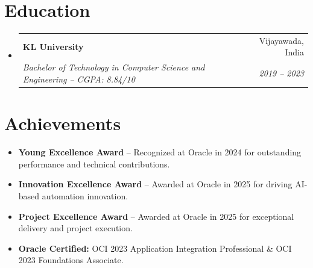\documentclass[letterpaper,11pt]{article}
\makeatletter
\newcommand{\resumeItem}[1]{
  \item\small{
    {#1 \vspace{-2pt}}
  }
}
\newcommand{\resumeSubheading}[4]{
  \vspace{-2pt}\item
    \begin{tabular*}{0.97\textwidth}[t]{l@{\extracolsep{\fill}}r}
      \textbf{#1} & #2 \\
      \textit{\small#3} & \textit{\small #4} \\
    \end{tabular*}\vspace{-7pt}
}
\newcommand{\resumeSubHeadingListStart}{\begin{itemize}[leftmargin=0.15in, label={}]}
\newcommand{\resumeSubHeadingListEnd}{\end{itemize}}
\newcommand{\resumeItemListStart}{\begin{itemize}}
\newcommand{\resumeItemListEnd}{\end{itemize}\vspace{-5pt}}
\makeatother
\begin{document}
\section{Education}
\resumeSubHeadingListStart
    \resumeSubheading
        {KL University}{Vijayawada, India}
        {Bachelor of Technology in Computer Science and Engineering -- CGPA: 8.84/10}{2019 -- 2023}
\resumeSubHeadingListEnd

\section{Achievements}
\resumeItemListStart
    \resumeItem{\textbf{Young Excellence Award} -- Recognized at Oracle in 2024 for outstanding performance and technical contributions.}
    \resumeItem{\textbf{Innovation Excellence Award} -- Awarded at Oracle in 2025 for driving AI-based automation innovation.}
    \resumeItem{\textbf{Project Excellence Award} -- Awarded at Oracle in 2025 for exceptional delivery and project execution.}
    \resumeItem{\textbf{Oracle Certified:} OCI 2023 Application Integration Professional \& OCI 2023 Foundations Associate.}
\resumeItemListEnd
\end{document}
